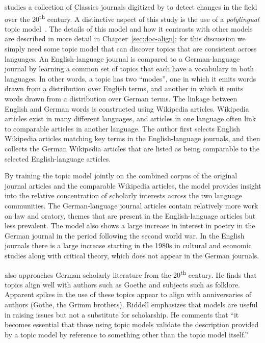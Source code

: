 \citet{mimno-12b} studies a collection of Classics journals digitized by  to detect changes in the field over the 20\textsuperscript{th} century.
A distinctive aspect of this study is the use of a {\em polylingual} topic model~\citep{mimno-09}.  The details of this model and how it contrasts with other models are described in more detail in Chapter~\ref{sec:doc-align}; for this discussion we simply need some topic model that can discover topics that are consistent across languages.
An English-language journal is compared to a German-language journal by learning a common set of topics that each have a vocabulary in both languages.
In other words, a topic has two ``modes'', one in which it emits words drawn from a distribution over English terms, and another in which it emits words drawn from a distribution over German terms.
The linkage between English and German words is constructed using Wikipedia articles.
Wikipedia articles exist in many different languages, and articles in one language often link to comparable articles in another language.
The author first selects English Wikipedia articles matching key terms in the English-language journals, and then collects the German Wikipedia articles that are listed as being comparable to the selected English-language articles.

By training the topic model jointly on the combined corpus of the original journal articles and the comparable Wikipedia articles, the model provides insight into the relative concentration of scholarly interests across the two language communities.
The German-language journal articles contain relatively more work on law and oratory, themes that are present in the English-language articles but less prevalent.
The model also shows a large increase in  interest in poetry in the German journal in the period following the second world war.
In the English journals there is a large increase starting in the 1980s in cultural and economic studies along with critical theory, which does not appear in the German journals.

\citet{riddell-12} also approaches German scholarly literature from the 20\textsuperscript{th} century. He finds that topics align well with authors such as Goethe and subjects such as folklore. Apparent spikes in the use of these topics appear to align with anniversaries of authors (G\"othe, the Grimm brothers).
Riddell emphasizes that models are useful in raising issues but not a substitute for scholarship.
He comments that ``it becomes essential that those using topic models validate the description provided by a topic model by reference to something other than the topic model itself.''

